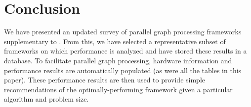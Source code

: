 \documentclass[conference]{IEEEtran}
\begin{document}


\section{Conclusion} %
We have presented an updated survey of parallel graph processing frameworks supplementary to \cite{Doekemeijer:2015:GPFSurvey}. From this, we have selected a representative subset of frameworks on which performance is analyzed and have stored these results in a database. To facilitate parallel graph processing, hardware information and performance results are automatically populated (as were all the tables in this paper). These performance results are then used to provide simple recommendations of the optimally-performing framework given a particular algorithm and problem size.

%


\end{document}
